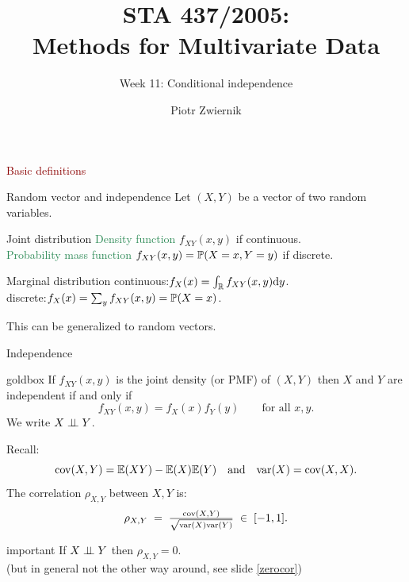 \documentclass[11pt,handout,aspectratio=169,dvipsnames]{beamer}
\title[STA437-Week1]{STA 437/2005: \\ Methods for Multivariate Data}
\subtitle[]{Week 11: Conditional independence}
\author[Piotr Zwiernik]{Piotr Zwiernik}
\institute[UofT]{University of Toronto}
\date{}
\begin{document}
\maketitle

\begin{frame}{}
\begin{center}
	{\huge \textcolor{DarkRed}{Basic definitions}}
\end{center}
\end{frame}

\begin{frame}{Random vector and independence}
	Let $(X,Y)$ be a vector of two random variables.
	\begin{alertblock}{Joint distribution}
		\textcolor{SeaGreen}{Density function} $f_{XY}(x,y)$ if continuous.\\[.1cm]
		\textcolor{SeaGreen}{Probability mass function} $f_{XY}(x,y)=\P(X=x,Y=y)$ if discrete.
	\end{alertblock}
		\begin{alertblock}{Marginal distribution}
continuous:\;\;\;$f_X(x)=\int_\R f_{XY}(x,y){\rm d}y$.\\[.1cm]
discrete:\;\;\;$f_X(x)=\sum_y f_{XY}(x,y)=\P(X=x)$.
	\end{alertblock}
	This can be generalized to random vectors.
\end{frame}

\begin{frame}{Independence}
\begin{beamercolorbox}[wd=\paperwidth,sep=2pt]{goldbox}
	If $f_{XY}(x,y)$ is the joint density (or PMF) of $(X,Y)$ then $X$ and $Y$ are independent if and only if \\[-.5cm] $$ f_{XY}(x,y)=f_X(x)f_Y(y)\qquad\mbox{for all }x,y.$$
		We write \alert{$X\indep Y$}.	
\end{beamercolorbox}
		Recall:
		$$
		\cov(X,Y)=\E(XY)-\E(X)\E(Y)\quad\mbox{and}\quad \var(X)=\cov(X,X).
		$$
		The correlation $\rho_{X,Y}$ between $X,Y$ is:
		$$
		\rho_{X,Y}\;=\;\tfrac{\cov(X,Y)}{\sqrt{\var(X)\var(Y)}}\;\in\;[-1,1].
		$$
		\begin{beamercolorbox}[wd=\paperwidth,sep=2pt]{important}
			If $X\indep Y$ then $\rho_{X,Y}=0$.\\ {\footnotesize(but in general not the other way around, see slide \ref{zerocor})}
		\end{beamercolorbox}
\end{frame}
\end{document}
